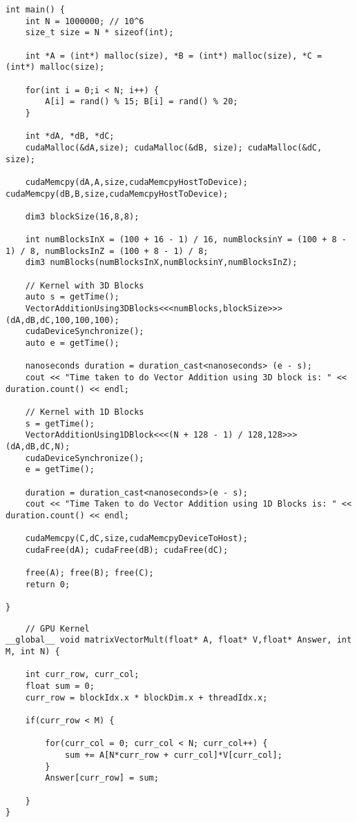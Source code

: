 \begin{lstlisting}
int main() {
    int N = 1000000; // 10^6
    size_t size = N * sizeof(int);

    int *A = (int*) malloc(size), *B = (int*) malloc(size), *C = (int*) malloc(size);

    for(int i = 0;i < N; i++) {
        A[i] = rand() % 15; B[i] = rand() % 20;
    }

    int *dA, *dB, *dC;
    cudaMalloc(&dA,size); cudaMalloc(&dB, size); cudaMalloc(&dC, size);

    cudaMemcpy(dA,A,size,cudaMemcpyHostToDevice); cudaMemcpy(dB,B,size,cudaMemcpyHostToDevice);

    dim3 blockSize(16,8,8);

    int numBlocksInX = (100 + 16 - 1) / 16, numBlocksinY = (100 + 8 - 1) / 8, numBlocksInZ = (100 + 8 - 1) / 8;
    dim3 numBlocks(numBlocksInX,numBlocksinY,numBlocksInZ);

    // Kernel with 3D Blocks
    auto s = getTime();
    VectorAdditionUsing3DBlocks<<<numBlocks,blockSize>>> (dA,dB,dC,100,100,100);
    cudaDeviceSynchronize();
    auto e = getTime();

    nanoseconds duration = duration_cast<nanoseconds> (e - s);
    cout << "Time taken to do Vector Addition using 3D block is: " << duration.count() << endl;

    // Kernel with 1D Blocks
    s = getTime();
    VectorAdditionUsing1DBlock<<<(N + 128 - 1) / 128,128>>>(dA,dB,dC,N);
    cudaDeviceSynchronize();
    e = getTime();

    duration = duration_cast<nanoseconds>(e - s);
    cout << "Time Taken to do Vector Addition using 1D Blocks is: " << duration.count() << endl;

    cudaMemcpy(C,dC,size,cudaMemcpyDeviceToHost);
    cudaFree(dA); cudaFree(dB); cudaFree(dC);

    free(A); free(B); free(C);
    return 0;
    
}
\end{lstlisting}


\begin{lstlisting}
    // GPU Kernel
__global__ void matrixVectorMult(float* A, float* V,float* Answer, int M, int N) {
    
    int curr_row, curr_col;
    float sum = 0;
    curr_row = blockIdx.x * blockDim.x + threadIdx.x;

    if(curr_row < M) {

        for(curr_col = 0; curr_col < N; curr_col++) {
            sum += A[N*curr_row + curr_col]*V[curr_col];
        }
        Answer[curr_row] = sum;

    }
}

\end{lstlisting}

